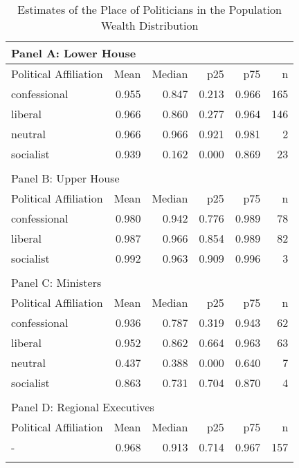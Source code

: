 \begin{table}[ht]
\centering
\begin{tabular}{lrrrrr}
   
\multicolumn{6}{l}{Panel A: Lower House}\\ 
\hline
Political Affiliation & Mean & Median & p25 & p75 & n \\\hline

confessional & 0.955 & 0.847 & 0.213 & 0.966 & 165 \\ 
  liberal & 0.966 & 0.860 & 0.277 & 0.964 & 146 \\ 
  neutral & 0.966 & 0.966 & 0.921 & 0.981 & 2 \\ 
  socialist & 0.939 & 0.162 & 0.000 & 0.869 & 23 \\ 
   \hline\\ 
\multicolumn{6}{l}{Panel B: Upper House}\\ 
\hline
Political Affiliation & Mean & Median & p25 & p75 & n \\\hline
confessional & 0.980 & 0.942 & 0.776 & 0.989 & 78 \\ 
  liberal & 0.987 & 0.966 & 0.854 & 0.989 & 82 \\ 
  socialist & 0.992 & 0.963 & 0.909 & 0.996 & 3 \\ 
   \hline\\ 
\multicolumn{6}{l}{Panel C: Ministers}\\ 
\hline
Political Affiliation & Mean & Median & p25 & p75 & n \\\hline
confessional & 0.936 & 0.787 & 0.319 & 0.943 & 62 \\ 
  liberal & 0.952 & 0.862 & 0.664 & 0.963 & 63 \\ 
  neutral & 0.437 & 0.388 & 0.000 & 0.640 & 7 \\ 
  socialist & 0.863 & 0.731 & 0.704 & 0.870 & 4 \\ 
   \hline\\ 
\multicolumn{6}{l}{Panel D: Regional Executives}\\ 
\hline
Political Affiliation & Mean & Median & p25 & p75 & n \\\hline
- & 0.968 & 0.913 & 0.714 & 0.967 & 157 \\ 
   \hline
\multicolumn{6}{l}{}\\
\end{tabular}
\caption{Estimates of the Place of Politicians in the Population Wealth Distribution} 
\label{tab:comp_population}
\end{table}


